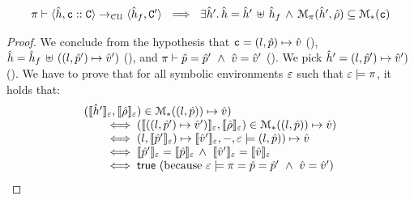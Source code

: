  \begin{lemma} 
\label{successful:unification}
$$
\begin{array}{l}
\cellunification{\sheap, \cell \lstcons \cells}{\sheap_f, \cells'}{\pc} \ \implies \
%
     \exists \sheap' . \, \sheap = \sheap' \dunion \sheap_f  \, \wedge \, 
		\smodels{\sheap', \sstore}{\pc} \subseteq \sepmodels{\cell}
\end{array}
$$
 \end{lemma}
 \begin{proof}
%
We conclude from the hypothesis that $\mathtt{c} = (l,\hat{p})\mapsto \hat{v}$ (), 
$\hat{h} = \hat{h}_f \, \uplus \, ((l, \hat{p}') \mapsto \hat{v}')$ (\ieq{2}), and 
$\pi \vdash \hat{p} = \hat{p}' \ \wedge \ \hat{v} = \hat{v}'$ (\ieq{3}). 
We pick $\hat{h}' = (l, \hat{p}') \mapsto \hat{v}')$ (\ieq{4}). 
We have to prove that for all symbolic environments 
$\varepsilon$ such that $\varepsilon \models \pi$, it holds that: 
$$
\begin{array}{l}
(\llbracket \hat{h}' \rrbracket_{\varepsilon}, \llbracket \hat\rho \rrbracket_{\varepsilon}) \in \mathcal{M}_{*}((l, \hat{p}))\mapsto \hat{v}) \\
   \qquad \iff (\llbracket ((l, \hat{p}') \mapsto \hat{v}') \rrbracket_{\varepsilon}, \llbracket \hat\rho \rrbracket_{\varepsilon}) \in \mathcal{M}_{*}((l, \hat{p}))\mapsto \hat{v}) \\
   \qquad \iff  (l, \llbracket \hat{p}' \rrbracket_{\varepsilon}) \mapsto \llbracket \hat{v}' \rrbracket_{\varepsilon}, -, \varepsilon \models (l, \hat{p}))\mapsto \hat{v} \\
   \qquad \iff \llbracket \hat{p}' \rrbracket_{\varepsilon} = \llbracket \hat{p} \rrbracket_{\varepsilon} \, \wedge \ \llbracket \hat{v}' \rrbracket_{\varepsilon} = \llbracket \hat{v} \rrbracket_{\varepsilon} \\
   \qquad \iff {\sf true} \text{ (because } \varepsilon \models \pi = \hat{p} = \hat{p}' \ \wedge \ \hat{v} = \hat{v}' \text{)}
\end{array}
$$
\end{proof}
 

